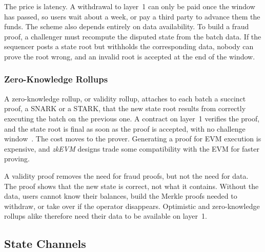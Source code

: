 The price is latency.
A withdrawal to layer~1 can only be paid once the window has passed, so users wait about a week, or pay a third party to advance them the funds.
The scheme also depends entirely on data availability.
To build a fraud proof, a challenger must recompute the disputed state from the batch data.
If the sequencer posts a state root but withholds the corresponding data, nobody can prove the root wrong, and an invalid root is accepted at the end of the window.

\subsubsection{Zero-Knowledge Rollups}\label{sec:bg:l2:rollups:zk}


A zero-knowledge rollup, or validity rollup, attaches to each batch a succinct proof, a SNARK or a STARK, that the new state root results from correctly executing the batch on the previous one.
A contract on layer~1 verifies the proof, and the state root is final as soon as the proof is accepted, with no challenge window~\cite{gudgeon2020sok,ethzkrollups}.
The cost moves to the prover.
Generating a proof for EVM execution is expensive, and \emph{zkEVM} designs trade some compatibility with the EVM for faster proving.

A validity proof removes the need for fraud proofs, but not the need for data.
The proof shows that the new state is correct, not what it contains.
Without the data, users cannot know their balances, build the Merkle proofs needed to withdraw, or take over if the operator disappears.
Optimistic and zero-knowledge rollups alike therefore need their data to be available on layer~1.

\subsection{State Channels}\label{sec:bg:l2:channels}


